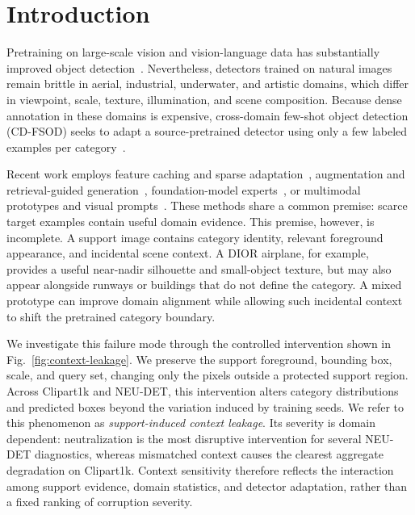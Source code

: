 \section{Introduction}
\label{sec:intro}

Pretraining on large-scale vision and vision-language data has substantially improved object detection~\cite{detr,dino,groundingdino}. Nevertheless, detectors trained on natural images remain brittle in aerial, industrial, underwater, and artistic domains, which differ in viewpoint, scale, texture, illumination, and scene composition. Because dense annotation in these domains is expensive, cross-domain few-shot object detection (CD-FSOD) seeks to adapt a source-pretrained detector using only a few labeled examples per category~\cite{cdvito,domainrag}.

Recent work employs feature caching and sparse adaptation~\cite{ifc,sivito}, augmentation and retrieval-guided generation~\cite{ets,domainrag}, foundation-model experts~\cite{vfmmoe,yu2026}, or multimodal prototypes and visual prompts~\cite{lmp,petdino,astigmatism}. These methods share a common premise: scarce target examples contain useful domain evidence. This premise, however, is incomplete. A support image contains category identity, relevant foreground appearance, and incidental scene context. A DIOR airplane, for example, provides a useful near-nadir silhouette and small-object texture, but may also appear alongside runways or buildings that do not define the category. A mixed prototype can improve domain alignment while allowing such incidental context to shift the pretrained category boundary.

We investigate this failure mode through the controlled intervention shown in Fig.~\ref{fig:context-leakage}. We preserve the support foreground, bounding box, scale, and query set, changing only the pixels outside a protected support region. Across Clipart1k and NEU-DET, this intervention alters category distributions and predicted boxes beyond the variation induced by training seeds. We refer to this phenomenon as \emph{support-induced context leakage}. Its severity is domain dependent: neutralization is the most disruptive intervention for several NEU-DET diagnostics, whereas mismatched context causes the clearest aggregate degradation on Clipart1k. Context sensitivity therefore reflects the interaction among support evidence, domain statistics, and detector adaptation, rather than a fixed ranking of corruption severity.


